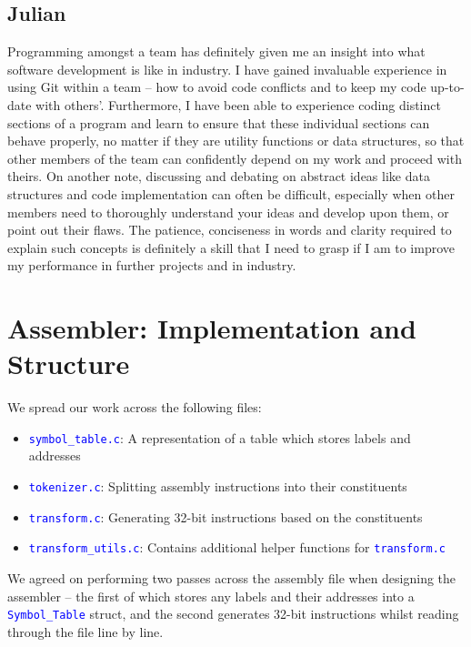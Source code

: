 \documentclass[11pt]{article}
\newcommand{\code}[1]{\mbox{\texttt{\textcolor{blue}{#1}}}}
\begin{document}
\subsection{Julian}

Programming amongst a team has definitely given me an insight into what software development is like in industry. I have gained invaluable experience in using Git within a team – how to avoid code conflicts and to keep my code up-to-date with others'. Furthermore, I have been able to experience coding distinct sections of a program and learn to ensure that these individual sections can behave properly, no matter if they are utility functions or data structures, so that other members of the team can confidently depend on my work and proceed with theirs. On another note, discussing and debating on abstract ideas like data structures and code implementation can often be difficult, especially when other members need to thoroughly understand your ideas and develop upon them, or point out their flaws. The patience, conciseness in words and clarity required to explain such concepts is definitely a skill that I need to grasp if I am to improve my performance in further projects and in industry.

\section{Assembler: Implementation and Structure}

We spread our work across the following files:

\begin{itemize}
\item \code{symbol\_table.c}: A representation of a table which stores labels and addresses
\item \code{tokenizer.c}: Splitting assembly instructions into their constituents
\item \code{transform.c}: Generating 32-bit instructions based on the constituents
\item \code{transform\_utils.c}: Contains additional helper functions for \code{transform.c}
\end{itemize}

We agreed on performing two passes across the assembly file when designing the assembler – the first of which stores any labels and their addresses into a \code{Symbol\_Table} struct, and the second generates 32-bit instructions whilst reading through the file line by line.\\
\end{document}
